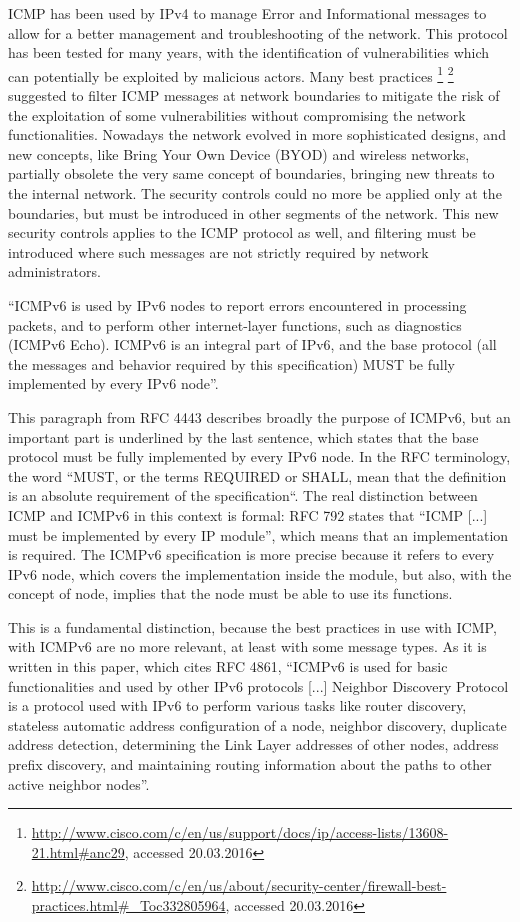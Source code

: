 \documentclass[12pt]{article}
\begin{document}
ICMP has been used by IPv4 to manage Error and Informational messages to allow for a better management and troubleshooting of the network.  This protocol has been tested for many years, with the identification of vulnerabilities which can potentially be exploited by malicious actors. Many best practices \footnote{\url{http://www.cisco.com/c/en/us/support/docs/ip/access-lists/13608-21.html\#anc29}, accessed 20.03.2016} \footnote{\url{http://www.cisco.com/c/en/us/about/security-center/firewall-best-practices.html\#\_Toc332805964}, accessed 20.03.2016} suggested to filter ICMP messages at network boundaries to mitigate the risk of the exploitation of some vulnerabilities without compromising the network functionalities. Nowadays the network evolved in more sophisticated designs, and new concepts, like Bring Your Own Device (BYOD) and wireless networks, partially obsolete the very same concept of boundaries, bringing new threats to the internal network. The security controls could no more be applied only at the boundaries, but must be introduced in other segments of the network. This new security controls applies to the ICMP protocol as well, and filtering must be introduced where such messages are not strictly required by network administrators.

``ICMPv6 is used by IPv6 nodes to report errors encountered in processing packets, and to perform other internet-layer functions, such as diagnostics (ICMPv6 Echo). ICMPv6 is an integral part of IPv6, and the base protocol (all the messages and behavior required by this specification) MUST be fully implemented by every IPv6 node''\cite{rfc4443}.

This paragraph from RFC 4443 describes broadly the purpose of ICMPv6, but an important part is underlined by the last sentence, which states that the base protocol must be fully implemented by every IPv6 node. In the RFC terminology, the word “MUST, or the terms REQUIRED or SHALL, mean that the definition is an absolute requirement of the specification“\cite{rfc2119}. The real distinction between ICMP and ICMPv6 in this context is formal: RFC 792 states that ``ICMP [...] must be implemented by every IP module''\cite{rfc792}, which means that an implementation is required. The ICMPv6 specification is more precise because it refers to every IPv6 node, which covers the implementation inside the module, but also, with the concept of node, implies that the node must be able to use its functions.

This is a fundamental distinction, because the best practices in use with ICMP, with ICMPv6 are no more relevant, at least with some message types. As it is written in this paper\cite{chak}, which cites RFC 4861\cite{rfc4861}, ``ICMPv6 is used for basic functionalities and used by other IPv6 protocols [...] Neighbor Discovery Protocol is a protocol used with IPv6 to perform various tasks like router discovery, stateless automatic address configuration of a node, neighbor discovery, duplicate address detection, determining the Link Layer addresses of other nodes, address prefix discovery, and maintaining routing information about the paths to other active neighbor nodes''.
\end{document}
